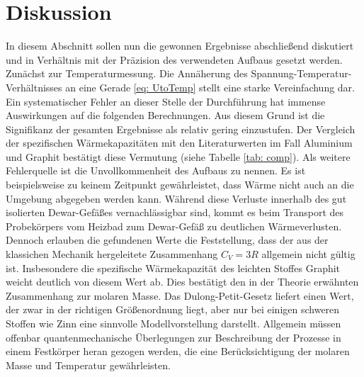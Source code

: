 \section{Diskussion}
In diesem Abschnitt sollen nun die gewonnen Ergebnisse abschließend diskutiert und in
Verhältnis mit der Präzision des verwendeten Aufbaus gesetzt werden. \\
Zunächst zur Temperaturmessung. Die Annäherung des Spannung-Temperatur-Verhältnisses
an eine Gerade \eqref{eq: UtoTemp} stellt eine starke Vereinfachung dar. Ein systematischer
Fehler an dieser Stelle der Durchführung hat immense Auswirkungen auf die folgenden Berechnungen.
Aus diesem Grund ist die Signifikanz der gesamten Ergebnisse als relativ gering einzustufen.
Der Vergleich der spezifischen Wärmekapazitäten mit den Literaturwerten im Fall Aluminium und Graphit bestätigt diese Vermutung (siehe
Tabelle \ref{tab: comp}). Als weitere Fehlerquelle ist die Unvollkommenheit des Aufbaus zu nennen.
Es ist beispielsweise zu keinem Zeitpunkt gewährleistet, dass Wärme nicht auch an die Umgebung abgegeben werden kann. Während diese
Verluste innerhalb des gut isolierten Dewar-Gefäßes vernachlässigbar sind, kommt es beim Transport des Probekörpers vom Heizbad zum
Dewar-Gefäß zu deutlichen Wärmeverlusten. \\
Dennoch erlauben die gefundenen Werte die Feststellung, dass der aus der klassichen Mechanik hergeleitete Zusammenhang $C_V = 3R$ allgemein
nicht gültig ist. Insbesondere die spezifische Wärmekapazität des leichten Stoffes Graphit weicht deutlich von diesem Wert ab. Dies bestätigt
den in der Theorie erwähnten Zusammenhang zur molaren Masse. Das Dulong-Petit-Gesetz liefert
einen Wert, der zwar in der richtigen Größenordnung liegt, aber nur bei einigen schweren Stoffen wie Zinn eine sinnvolle Modellvorstellung darstellt. Allgemein
müssen offenbar quantenmechanische Überlegungen zur Beschreibung der Prozesse in einem Festkörper heran gezogen werden, die eine Berücksichtigung
der molaren Masse und Temperatur gewährleisten.
